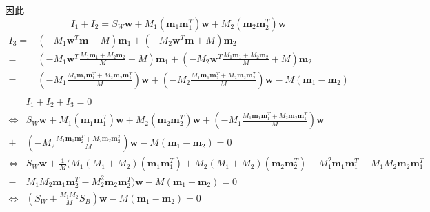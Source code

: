 \documentclass{article}
\begin{document}
因此
\begin{equation}
I_1+I_2=S_W\bm{w}+M_1(\bm{m}_1\bm{m}_1^T)\bm{w}+M_2(\bm{m}_2\bm{m}_2^T)\bm{w}
\end{equation}
\begin{align*}
I_3 = & (-M_1\bm{w}^T\bm{m}-M)\bm{m}_1+(-M_2\bm{w}^T\bm{m}+M)\bm{m}_2\\
= & (-M_1\bm{w}^T\frac{M_1\bm{m}_1+M_2\bm{m}_2}{M}-M)\bm{m}_1+(-M_2\bm{w}^T\frac{M_1\bm{m}_1+M_2\bm{m}_2}{M}+M)\bm{m}_2\\
= & (-M_1\frac{M_1\bm{m}_1\bm{m}_1^T+M_2\bm{m}_2\bm{m}_1^T}{M})\bm{w}+(-M_2\frac{M_1\bm{m}_1\bm{m}_2^T+M_2\bm{m}_2\bm{m}_2^T}{M})\bm{w}-M(\bm{m}_1-\bm{m}_2)\\
\end{align*}
\begin{align*}
&I_1+I_2+I_3=0\\
\iff & S_W\bm{w}+M_1(\bm{m}_1\bm{m}_1^T)\bm{w}+M_2(\bm{m}_2\bm{m}_2^T)\bm{w}+(-M_1\frac{M_1\bm{m}_1\bm{m}_1^T+M_2\bm{m}_2\bm{m}_1^T}{M})\bm{w}\\
+&(-M_2\frac{M_1\bm{m}_1\bm{m}_2^T+M_2\bm{m}_2\bm{m}_2^T}{M})\bm{w}-M(\bm{m}_1-\bm{m}_2)=0\\
\iff & S_W\bm{w}+\frac{1}{M}(M_1(M_1+M_2)(\bm{m}_1\bm{m}_1^T)+M_2(M_1+M_2)(\bm{m}_2\bm{m}_2^T)-M_1^2\bm{m}_1\bm{m}_1^T-M_1M_2\bm{m}_2\bm{m}_1^T\\
-&M_1M_2\bm{m}_1\bm{m}_2^T-M_2^2\bm{m}_2\bm{m}_2^T)\bm{w}-M(\bm{m}_1-\bm{m}_2)=0\\
\iff & (S_W+\frac{M_1M_2}{M}S_B)\bm{w}-M(\bm{m}_1-\bm{m}_2)=0
\end{align*}
\end{document}
